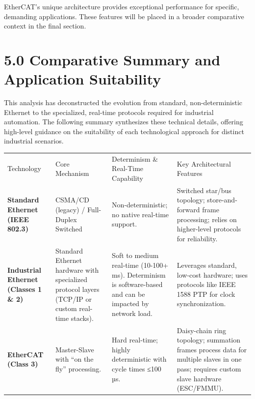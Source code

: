 \documentclass[a4paper, 12pt]{book} %
\begin{document}
EtherCAT's unique architecture provides exceptional performance for
specific, demanding applications. These features will be placed in a
broader comparative context in the final section.

\section{5.0 Comparative Summary and Application
Suitability}\label{comparative-summary-and-application-suitability}

This analysis has deconstructed the evolution from standard,
non-deterministic Ethernet to the specialized, real-time protocols
required for industrial automation. The following summary synthesizes
these technical details, offering high-level guidance on the suitability
of each technological approach for distinct industrial scenarios.

\begin{longtable}[]{@{}
  >{\raggedright\arraybackslash}p{}
  >{\raggedright\arraybackslash}p{}
  >{\raggedright\arraybackslash}p{}
  >{\raggedright\arraybackslash}p{}@{}}
\toprule\noalign{}
\endhead
\bottomrule\noalign{}
\endlastfoot
Technology & Core Mechanism & Determinism \& Real-Time Capability & Key
Architectural Features \\
\textbf{Standard Ethernet (IEEE 802.3)} & CSMA/CD (legacy) / Full-Duplex
Switched & Non-deterministic; no native real-time support. & Switched
star/bus topology; store-and-forward frame processing; relies on
higher-level protocols for reliability. \\
\textbf{Industrial Ethernet (Classes 1 \& 2)} & Standard Ethernet
hardware with specialized protocol layers (TCP/IP or custom real-time
stacks). & Soft to medium real-time (10-100+ ms). Determinism is
software-based and can be impacted by network load. & Leverages
standard, low-cost hardware; uses protocols like IEEE 1588 PTP for clock
synchronization. \\
\textbf{EtherCAT (Class 3)} & Master-Slave with ``on the fly''
processing. & Hard real-time; highly deterministic with cycle times ≤100
µs. & Daisy-chain ring topology; summation frames process data for
multiple slaves in one pass; requires custom slave hardware
(ESC/FMMU). \\
\end{longtable}
\end{document}

